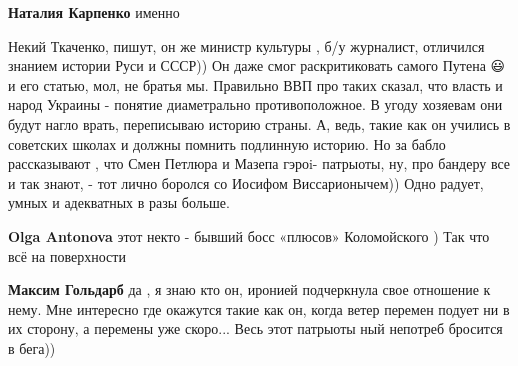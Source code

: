 \begin{itemize}
\begin{itemize}
 
\textbf{Наталия Карпенко} именно
\end{itemize}

 

Некий Ткаченко, пишут, он же министр культуры , б/у журналист, отличился
знанием истории Руси и СССР)) Он даже смог раскритиковать самого Путена 😃и его
статью, мол, не братья мы. Правильно ВВП про таких сказал, что власть и народ
Украины - понятие диаметрально противоположное. В угоду хозяевам они будут
нагло врать, переписываю историю страны. А, ведь, такие как он учились в
советских школах и должны помнить подлинную историю. Но за бабло рассказывают ,
что Смен Петлюра и Мазепа гэроi- патрыоты, ну, про бандеру все и так знают, -
тот лично боролся со Иосифом Виссарионычем)) Одно радует, умных и адекватных в
разы больше.

\begin{itemize}
 
\textbf{Olga Antonova} этот некто - бывший босс «плюсов» Коломойского )
Так что всё на поверхности

 
\textbf{Максим Гольдарб} да , я знаю кто он, иронией подчеркнула свое отношение к нему. Мне интересно где окажутся такие как он, когда ветер перемен подует ни в их сторону, а перемены уже скоро... Весь этот патрыоты ный непотреб бросится в бега))

 

\end{itemize}
\end{itemize}
